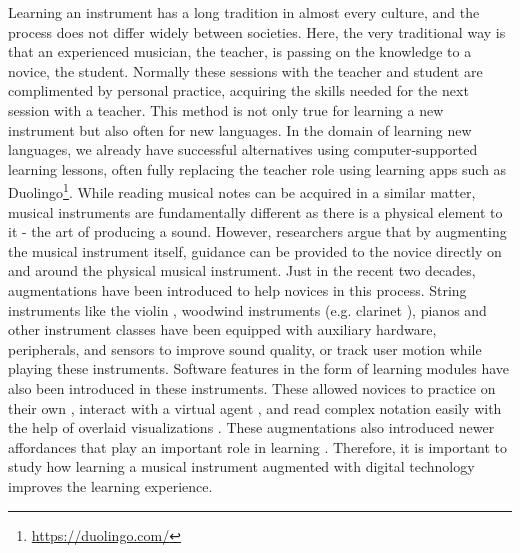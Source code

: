 \documentclass[sigconf, screen, review]{acmart}
\begin{document}
Learning an instrument has a long tradition in almost every culture, and the process does not differ widely between societies. Here, the very traditional way is that an experienced musician, the teacher, is passing on the knowledge to a novice, the student. Normally these sessions with the teacher and student are complimented by personal practice, acquiring the skills needed for the next session with a teacher. This method is not only true for learning a new instrument but also often for new languages. In the domain of learning new languages, we already have successful alternatives using computer-supported learning lessons, often fully replacing the teacher role using learning apps such as Duolingo\footnote{\url{https://duolingo.com/}}. While reading musical notes can be acquired in a similar matter, musical instruments are fundamentally different as there is a physical element to it - the art of producing a sound. However, researchers argue that by augmenting the musical instrument itself, guidance can be provided to the novice directly on and around the physical musical instrument. Just in the recent two decades, augmentations have been introduced to help novices in this process. String instruments like the violin \cite{overholt2005overtone}, woodwind instruments (e.g. clarinet \cite{silva2008interaction}), pianos \cite{mcpherson2010augmenting} and other instrument classes \cite{turchet2018some, newton2011examining} have been equipped with auxiliary hardware, peripherals, and sensors to improve sound quality, or track user motion while playing these instruments. Software features in the form of learning modules have also been introduced in these instruments. These allowed novices to practice on their own \cite{fober2007vemus}, interact with a virtual agent \cite{costalonga2008agent, tidemann2009groovy}, and read complex notation easily with the help of overlaid visualizations \cite{trujano2018arpiano, gerry2019adept, santiniaugmented}. These augmentations also introduced newer affordances that play an important role in learning \cite{dede1996evolution}. Therefore, it is important to study how learning a musical instrument augmented with digital technology improves the learning experience.
\end{document}
